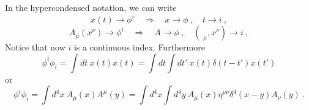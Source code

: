     In the hypercondensed notation, we can write 
    \begin{equation*}
        x(t) \rightarrow \phi^i \quad \Rightarrow \quad x \rightarrow \phi ~, \quad t \rightarrow i ~,
    \end{equation*}
    \begin{equation*}
        A_\mu(x^\nu) \rightarrow \phi^i \quad \Rightarrow \quad  A \rightarrow \phi ~, \quad  (\phantom{|}_\mu, x^\nu) \rightarrow i ~,
    \end{equation*}
    Notice that now $i$ is a continuous index. Furthermore 
    \begin{equation*}
        \phi^i \phi_i = \int dt ~ x(t) x(t) = \int dt \int dt' ~ x(t) \delta (t - t') x(t') 
    \end{equation*}
    or
    \begin{equation*}
        \phi^i \phi_i = \int d^4 x ~ A_\mu (x ) A^\mu (y) = \int d^4 x \int d^4 y ~ A_\mu (x) \eta^{\mu\nu} \delta^4 (x-y) A_\nu (y) ~.
    \end{equation*}

